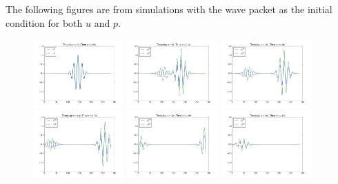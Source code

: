\documentclass{article} %
\theoremstyle{plain}
\numberwithin{equation}{section} %
\numberwithin{figure}{section} %
\numberwithin{table}{section} %
\begin{document}
\begin{enumerate}[\ \ (a)]
        \pagebreak
        The following figures are from simulations with the wave packet as the initial condition for both $u$ and $p$.
        \begin{figure}[ht!]
            \centering
            \includegraphics[width=0.31\textwidth]{figures/problem_1_a_000.png}
            \includegraphics[width=0.31\textwidth]{figures/problem_1_a_008.png}
            \includegraphics[width=0.31\textwidth]{figures/problem_1_a_016.png}
            \includegraphics[width=0.31\textwidth]{figures/problem_1_a_024.png}
            \includegraphics[width=0.31\textwidth]{figures/problem_1_a_032.png}
            \includegraphics[width=0.31\textwidth]{figures/problem_1_a_040.png}

\end{figure}
\end{enumerate}
\end{document}
